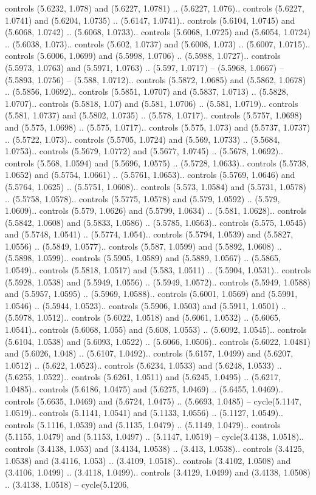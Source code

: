 controls (5.6232, 1.078) and (5.6227, 1.0781) .. (5.6227, 1.076).. controls (5.6227, 1.0741) and (5.6204, 1.0735) .. (5.6147, 1.0741).. controls (5.6104, 1.0745) and (5.6068, 1.0742) .. (5.6068, 1.0733).. controls (5.6068, 1.0725) and (5.6054, 1.0724) .. (5.6038, 1.073).. controls (5.602, 1.0737) and (5.6008, 1.073) .. (5.6007, 1.0715).. controls (5.6006, 1.0699) and (5.5998, 1.0706) .. (5.5988, 1.0727).. controls (5.5973, 1.0763) and (5.5971, 1.0763) .. (5.597, 1.0717) -- (5.5968, 1.0667) -- (5.5893, 1.0756) -- (5.588, 1.0712).. controls (5.5872, 1.0685) and (5.5862, 1.0678) .. (5.5856, 1.0692).. controls (5.5851, 1.0707) and (5.5837, 1.0713) .. (5.5828, 1.0707).. controls (5.5818, 1.07) and (5.581, 1.0706) .. (5.581, 1.0719).. controls (5.581, 1.0737) and (5.5802, 1.0735) .. (5.578, 1.0717).. controls (5.5757, 1.0698) and (5.575, 1.0698) .. (5.575, 1.0717).. controls (5.575, 1.073) and (5.5737, 1.0737) .. (5.5722, 1.073).. controls (5.5705, 1.0724) and (5.569, 1.0733) .. (5.5684, 1.0753).. controls (5.5679, 1.0772) and (5.5677, 1.0745) .. (5.5678, 1.0692).. controls (5.568, 1.0594) and (5.5696, 1.0575) .. (5.5728, 1.0633).. controls (5.5738, 1.0652) and (5.5754, 1.0661) .. (5.5761, 1.0653).. controls (5.5769, 1.0646) and (5.5764, 1.0625) .. (5.5751, 1.0608).. controls (5.573, 1.0584) and (5.5731, 1.0578) .. (5.5758, 1.0578).. controls (5.5775, 1.0578) and (5.579, 1.0592) .. (5.579, 1.0609).. controls (5.579, 1.0626) and (5.5799, 1.0634) .. (5.581, 1.0628).. controls (5.5842, 1.0608) and (5.5833, 1.0586) .. (5.5785, 1.0563).. controls (5.575, 1.0545) and (5.5748, 1.0541) .. (5.5774, 1.054).. controls (5.5794, 1.0539) and (5.5827, 1.0556) .. (5.5849, 1.0577).. controls (5.587, 1.0599) and (5.5892, 1.0608) .. (5.5898, 1.0599).. controls (5.5905, 1.0589) and (5.5889, 1.0567) .. (5.5865, 1.0549).. controls (5.5818, 1.0517) and (5.583, 1.0511) .. (5.5904, 1.0531).. controls (5.5928, 1.0538) and (5.5949, 1.0556) .. (5.5949, 1.0572).. controls (5.5949, 1.0588) and (5.5957, 1.0595) .. (5.5969, 1.0588).. controls (5.6001, 1.0569) and (5.5991, 1.0546) .. (5.5944, 1.0523).. controls (5.5906, 1.0503) and (5.5911, 1.0501) .. (5.5978, 1.0512).. controls (5.6022, 1.0518) and (5.6061, 1.0532) .. (5.6065, 1.0541).. controls (5.6068, 1.055) and (5.608, 1.0553) .. (5.6092, 1.0545).. controls (5.6104, 1.0538) and (5.6093, 1.0522) .. (5.6066, 1.0506).. controls (5.6022, 1.0481) and (5.6026, 1.048) .. (5.6107, 1.0492).. controls (5.6157, 1.0499) and (5.6207, 1.0512) .. (5.622, 1.0523).. controls (5.6234, 1.0533) and (5.6248, 1.0533) .. (5.6255, 1.0522).. controls (5.6261, 1.0511) and (5.6245, 1.0495) .. (5.6217, 1.0485).. controls (5.6186, 1.0475) and (5.6275, 1.0469) .. (5.6455, 1.0469).. controls (5.6635, 1.0469) and (5.6724, 1.0475) .. (5.6693, 1.0485) -- cycle(5.1147, 1.0519).. controls (5.1141, 1.0541) and (5.1133, 1.0556) .. (5.1127, 1.0549).. controls (5.1116, 1.0539) and (5.1135, 1.0479) .. (5.1149, 1.0479).. controls (5.1155, 1.0479) and (5.1153, 1.0497) .. (5.1147, 1.0519) -- cycle(3.4138, 1.0518).. controls (3.4138, 1.053) and (3.4134, 1.0538) .. (3.413, 1.0538).. controls (3.4125, 1.0538) and (3.4116, 1.053) .. (3.4109, 1.0518).. controls (3.4102, 1.0508) and (3.4106, 1.0499) .. (3.4118, 1.0499).. controls (3.4129, 1.0499) and (3.4138, 1.0508) .. (3.4138, 1.0518) -- cycle(5.1206, 